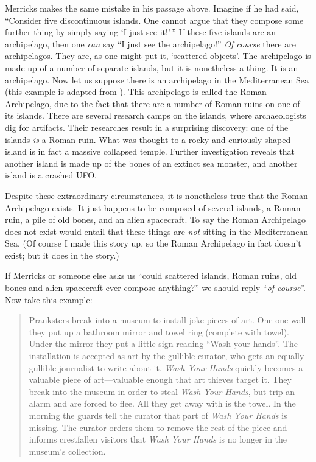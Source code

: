 \documentclass[11pt]{article}
\begin{document}
\begin{spacing}{1.25}
Merricks makes the same mistake in his passage above.  Imagine if he
had said, ``Consider five discontinuous islands.  One cannot argue
that they compose some further thing by simply saying `I just see
it!'\,'' If these five islands are an archipelago, then one {\em can}
say ``I just see the archipelago!''  {\em Of course} there are
archipelagos.  They are, as one might put it, `scattered objects'.
The archipelago is made up of a number of separate islands, but it is
nonetheless a thing.  It is an archipelago.  Now let us suppose there
is an archipelago in the Mediterranean Sea (this example is adapted
from \citet{hawthorne2008}).  This archipelago is called the Roman
Archipelago, due to the fact that there are a number of Roman ruins on
one of its islands.  There are several research camps on the islands,
where archaeologists dig for artifacts.  Their researches result in a
surprising discovery: one of the islands {\em is} a Roman ruin.  What
was thought to a rocky and curiously shaped island is in fact a
massive collapsed temple.  Further investigation reveals that another
island is made up of the bones of an extinct sea monster, and another
island is a crashed UFO.

Despite these extraordinary circumstances, it is nonetheless true that
the Roman Archipelago exists.  It just happens to be composed of
several islands, a Roman ruin, a pile of old bones, and an alien
spacecraft.  To say the Roman Archipelago does not exist would entail
that these things are {\em not} sitting in the Mediterranean Sea.  (Of
course I made this story up, so the Roman Archipelago in fact doesn't
exist; but it does in the story.)

If Merricks or someone else asks us ``could scattered islands, Roman
ruins, old bones and alien spacecraft ever compose anything?'' we
should reply ``{\em of course}''.  Now take this example:

\begin{quote}
Pranksters break into a museum to install joke pieces of art.  One one
wall they put up a bathroom mirror and towel ring (complete with
towel).  Under the mirror they put a little sign reading ``Wash your
hands''.  The installation is accepted as art by the gullible curator,
who gets an equally gullible journalist to write about it.  {\em Wash
  Your Hands} quickly becomes a valuable piece of art---valuable
enough that art thieves target it.  They break into the museum in
order to steal {\em Wash Your Hands}, but trip an alarm and are forced
to flee.  All they get away with is the towel.  In the morning the
guards tell the curator that part of {\em Wash Your Hands} is missing.
The curator orders them to remove the rest of the piece and informs
crestfallen visitors that {\em Wash Your Hands} is no longer in the
museum's collection.
\end{quote}


\end{spacing}
\end{document}

